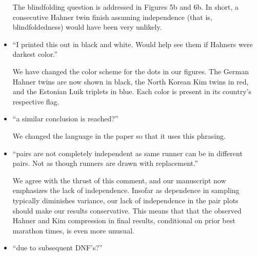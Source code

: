 \documentclass[12pt]{article}
\begin{document}
\begin{itemize}
  The blindfolding question is addressed in Figures 5b and 6b.  In
  short, a consecutive Hahner twin finish assuming independence (that
  is, blindfoldedness) would have been very unlikely.






\item ``I printed this out in black and white. Would help see them if
  Hahners were darkest color.''

  We have changed the color scheme for the dots in our figures.  The
  German Hahner twins are now shown in black, the North Korean Kim
  twins in red, and the Estonian Luik triplets in blue.  Each color is
  present in its country's respective flag.
  
\item ``a similar conclusion is reached?''
  
  We changed the language in the paper so that it uses this phrasing.
  
\item ``pairs are not completely independent as same runner can be in
  different pairs. Not as though runners are drawn with replacement.''

  We agree with the thrust of this comment, and our manuscript now
  emphasizes the lack of independence.  Insofar as dependence in
  sampling typically diminishes variance, our lack of independence in
  the pair plots should make our results conservative. This means that
  that the observed Hahner and Kim compression in final results,
  conditional on prior best marathon times, is even more unusual.

\item ``due to subsequent DNF's?''


\end{itemize}
\end{document}
